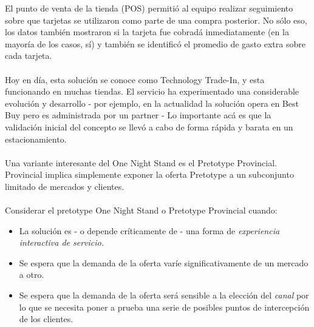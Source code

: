\documentclass{article}
\begin{document}
\begin{enumerate}
El punto de venta de la tienda (POS) permiti\'o al equipo realizar seguimiento sobre que tarjetas se utilizaron como parte de una compra posterior. No s\'olo eso, los datos tambi\'en mostraron si la tarjeta fue cobrad\'a inmediatamente (en la mayor\'ia de los casos, s\'i) y tambi\'en se identific\'o el promedio de gasto extra sobre cada tarjeta.
\\ \\
Hoy en d\'ia, esta soluci\'on se conoce como Technology Trade-In, y esta funcionando en muchas tiendas. El servicio ha experimentado una considerable evoluci\'on y desarrollo - por ejemplo, en la actualidad la soluci\'on opera en Best Buy pero es administrada por un partner - Lo importante ac\'a es que la validaci\'on inicial del concepto se llev\'o a cabo de forma r\'apida y barata en un estacionamiento.
\\ \\
Una variante interesante del One Night Stand es el Pretotype Provincial. Provincial implica simplemente exponer la oferta Pretotype a un subconjunto limitado de mercados y clientes.
\\ \\
Considerar el pretotype One Night Stand o Pretotype Provincial cuando:

\begin{itemize}

\item La soluci\'on es - o depende cr\'iticamente de - una forma de \textit{experiencia interactiva de servicio.}

\item Se espera que la demanda de la oferta var\'ie significativamente de un mercado a otro.

\item Se espera que la demanda de la oferta ser\'a sensible a la elecci\'on del \textit{canal} por lo que se necesita poner a prueba una serie de posibles puntos de intercepci\'on de los clientes.

\end{itemize}


\end{enumerate}
\end{document}
